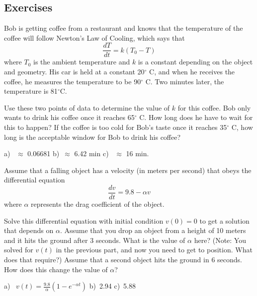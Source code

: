 \subsection{Exercises}

\begin{exercise}
Bob is getting coffee from a restaurant and knows that the temperature of the coffee will follow Newton's Law of Cooling, which says that
\begin{equation*}
\frac{dT}{dt} = k(T_0 - T)
\end{equation*}
where $T_0$ is the ambient temperature and $k$ is a constant depending on the object and geometry. His car is held at a constant 20$^\circ$ C, and when he receives the coffee, he measures the temperature to be 90$^\circ$ C. Two minutes later, the temperature is 81$^\circ$C.
\begin{tasks}
\task Use these two points of data to determine the value of $k$ for this coffee.
\task Bob only wants to drink his coffee once it reaches 65$^\circ$ C. How long does he have to wait for this to happen? 
\task If the coffee is too cold for Bob's taste once it reaches 35$^\circ$ C, how long is the acceptable window for Bob to drink his coffee?
\end{tasks} 
\end{exercise}
\comboSol{%
}
{%
a)~ $\approx$ 0.06681 \quad b)~$\approx$ 6.42 min \quad c)~ $\approx$ 16 min.
}

\begin{exercise}
Assume that a falling object has a velocity (in meters per second) that obeys the differential equation
\begin{equation*}
\frac{dv}{dt} = 9.8 - \alpha v
\end{equation*}
where $\alpha$ represents the drag coefficient of the object.
\begin{tasks}
\task Solve this differential equation with initial condition $v(0) = 0$ to get a solution that depends on $\alpha$. 
\task Assume that you drop an object from a height of 10 meters and it hits the ground after $3$ seconds. What is the value of $\alpha$ here? (Note: You solved for $v(t)$ in the previous part, and now you need to get to position. What does that require?)
\task Assume that a second object hits the ground in 6 seconds. How does this change the value of $\alpha$?
\end{tasks}
\end{exercise}
\comboSol{%
}
{%
a)~ $v(t) = \frac{9.8}{\alpha}(1 - e^{-\alpha t})$ \quad b)~2.94 \quad c)~5.88
}

